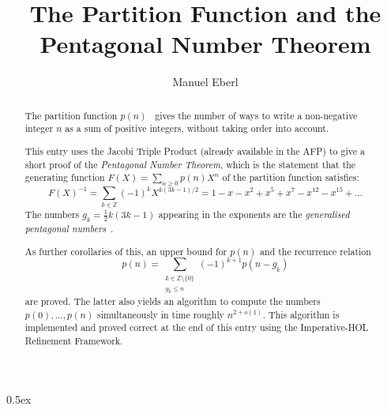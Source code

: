 \documentclass[11pt,a4paper]{article}
\newcommand{\oeiscite}[1]{\cite[\href{https://oeis.org/#1}{#1}]{oeis}}
\begin{document}
\title{The Partition Function and the Pentagonal Number Theorem}
\author{Manuel Eberl}
\maketitle

\begin{abstract}
The partition function $p(n)$~\oeiscite{A000041} gives the number of ways to write a non-negative
integer $n$ as a sum of positive integers, without taking order into account.

This entry uses the Jacobi Triple Product (already available in the AFP) to give a short proof of 
the \emph{Pentagonal Number Theorem}, which is the statement that the generating function 
$F(X) = \sum_{n\geq 0} p(n) X^n$ of the partition function satisfies:
\[F(X)^{-1} = \sum_{k\in\mathbb{Z}} (-1)^k X^{k(3k-1)/2} = 1 - x - x^2 + x^5 + x^7 - x^{12} - x^{15} + \ldots\]
The numbers $g_k = \frac{1}{2}k(3k-1)$ appearing in the exponents are the
\emph{generalised pentagonal numbers}~\oeiscite{A001318}.

As further corollaries of this, an upper bound for $p(n)$ and the recurrence relation
\[p(n) = \sum_{\substack{k\in\mathbb{Z}\setminus\{0\} \\ g_k \leq n}} (-1)^{k+1} p(n-g_k)\]
are proved. The latter also yields an algorithm to compute the numbers
$p(0), \ldots, p(n)$ simultaneously in time roughly $n^{2 + o(1)}$. This algorithm is
implemented and proved correct at the end of this entry using the Imperative-HOL Refinement Framework.
\end{abstract}
\newpage

\tableofcontents

\newpage
\parindent 0pt\parskip 0.5ex



\raggedright



\end{document}
